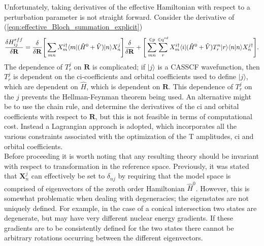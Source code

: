 \noindent Unfortunately, taking derivatives
of the effective Hamiltonian with respect to a perturbation parameter is not
straight forward. Consider the derivative of (\ref{eqn:effective_Bloch_summation_explicit})
\begin{equation}
\frac{\delta H^{eff}_{ij}} {\delta \mathbf{R} } =
\frac{\delta } {\delta \mathbf{R} } \Bigg{[} \sum_{mn}
 X_{m}^{i\dagger}\langle m | (\hat{H}^{0} + \hat{V}) | n \rangle X_{n}^{j} \Bigg {]}
\frac{\delta } {\delta \mathbf{R} }
+ \Bigg{[}  
\sum_{mn}^{\in \mathrm{p} }\sum_{r}^{\in \mathrm{q}^{sd}}
 X_{m}^{i\dagger}
\langle i | (\hat{H}^{0}+\hat{V}) T^{n}_{r} |r \rangle\langle n | n \rangle
 X_{n}^{j\dagger}
 \Bigg {]}.
\label{eqn:effective_Bloch_summation_derivative}
\end{equation}
The dependence of $T^{j}_{r}$ on $\mathbf{R}$ is complicated; if $|j\rangle$ is a CASSCF wavefunction, then $T^{j}_{r}$ is
dependent on the ci-coefficients and orbital coefficients used to define $|j\rangle$, which are dependent on $\hat{H}$,
which is dependent on $\mathbf{R}$. This dependence of $T^{j}_{r}$ on the $j$ prevents the Hellman-Feynman theorem being used. 
An alternative might be to use the chain rule, and determine the derivatives of the ci and
orbital coefficients with respect to $\mathbf{R}$, but this is not feasible in terms of computational cost.
Instead a Lagrangian approach is adopted, which incorporates all the various constraints associated with the optimization 
of the T amplitudes, ci and orbital coefficients.\\

\noindent Before proceeding it is worth noting that any resulting theory should be invariant with 
respect to transformation in the reference space. Previously, it was stated that $\mathbf{X}_{n}^{j}$ 
can effectively be set to $\delta_{nj}$ by requiring that the model space is comprised of eigenvectors
of the zeroth order Hamiltonian $\hat{H}^{0}$. However, this is somewhat problematic when dealing with 
degeneracies; the eigenstates are not uniquely defined. For example, in the case of a conical intersection two states are
degenerate, but may have very different nuclear energy gradients. If these gradients are to
be consistently defined for the two states there cannot be arbitrary rotations occurring between the
different eigenvectors.\\

